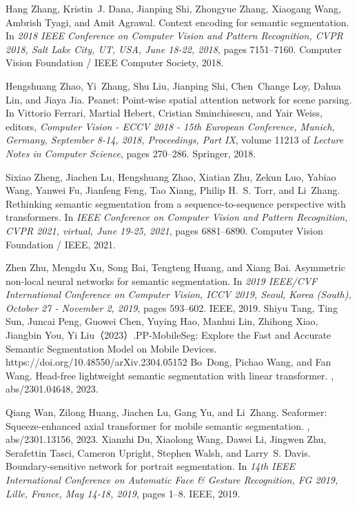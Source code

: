 \documentclass[11pt]{article}
\begin{document}
\begin{thebibliography}{99}
Hang Zhang, Kristin~J. Dana, Jianping Shi, Zhongyue Zhang, Xiaogang Wang,
  Ambrish Tyagi, and Amit Agrawal.
\newblock Context encoding for semantic segmentation.
\newblock In {\em 2018 {IEEE} Conference on Computer Vision and Pattern
  Recognition, {CVPR} 2018, Salt Lake City, UT, USA, June 18-22, 2018}, pages
  7151--7160. Computer Vision Foundation / {IEEE} Computer Society, 2018.

Hengshuang Zhao, Yi~Zhang, Shu Liu, Jianping Shi, Chen~Change Loy, Dahua Lin,
  and Jiaya Jia.
\newblock Psanet: Point-wise spatial attention network for scene parsing.
\newblock In Vittorio Ferrari, Martial Hebert, Cristian Sminchisescu, and Yair
  Weiss, editors, {\em Computer Vision - {ECCV} 2018 - 15th European
  Conference, Munich, Germany, September 8-14, 2018, Proceedings, Part {IX}},
  volume 11213 of {\em Lecture Notes in Computer Science}, pages 270--286.
  Springer, 2018.

Sixiao Zheng, Jiachen Lu, Hengshuang Zhao, Xiatian Zhu, Zekun Luo, Yabiao Wang,
  Yanwei Fu, Jianfeng Feng, Tao Xiang, Philip H.~S. Torr, and Li~Zhang.
\newblock Rethinking semantic segmentation from a sequence-to-sequence
  perspective with transformers.
\newblock In {\em {IEEE} Conference on Computer Vision and Pattern Recognition,
  {CVPR} 2021, virtual, June 19-25, 2021}, pages 6881--6890. Computer Vision
  Foundation / {IEEE}, 2021.

Zhen Zhu, Mengdu Xu, Song Bai, Tengteng Huang, and Xiang Bai.
\newblock Asymmetric non-local neural networks for semantic segmentation.
\newblock In {\em 2019 {IEEE/CVF} International Conference on Computer Vision,
  {ICCV} 2019, Seoul, Korea (South), October 27 - November 2, 2019}, pages
  593--602. {IEEE}, 2019.
Shiyu Tang, Ting Sun, Juncai Peng, Guowei Chen, Yuying Hao, Manhui Lin, Zhihong Xiao, Jiangbin You, Yi Liu（2023）.PP-MobileSeg: Explore the Fast and Accurate Semantic Segmentation Model on Mobile Devices.
https://doi.org/10.48550/arXiv.2304.05152
Bo~Dong, Pichao Wang, and Fan Wang.
\newblock Head-free lightweight semantic segmentation with linear transformer.
, abs/2301.04648, 2023.

Qiang Wan, Zilong Huang, Jiachen Lu, Gang Yu, and Li~Zhang.
\newblock Seaformer: Squeeze-enhanced axial transformer for mobile semantic
  segmentation.
, abs/2301.13156, 2023.
Xianzhi Du, Xiaolong Wang, Dawei Li, Jingwen Zhu, Serafettin Tasci, Cameron
  Upright, Stephen Walsh, and Larry~S. Davis.
\newblock Boundary-sensitive network for portrait segmentation.
\newblock In {\em 14th {IEEE} International Conference on Automatic Face {\&}
  Gesture Recognition, {FG} 2019, Lille, France, May 14-18, 2019}, pages 1--8.
  {IEEE}, 2019.


\end{thebibliography}
\end{document}
